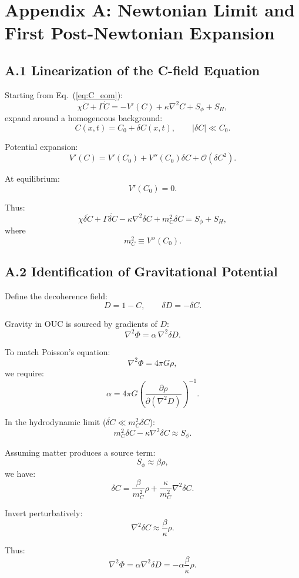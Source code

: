 \appendix
\section*{Appendix A: Newtonian Limit and First Post-Newtonian Expansion}


\subsection*{A.1 Linearization of the C-field Equation}

Starting from Eq.~(\ref{eq:C_eom}):
\[
\chi\ddot C + \Gamma\dot C
= -V'(C) + \kappa\nabla^2 C + S_\phi + S_H,
\]
expand around a homogeneous background:
\[
C(x,t) = C_0 + \delta C(x,t),
\qquad | \delta C | \ll C_0.
\]

Potential expansion:
\[
V'(C) = V'(C_0) + V''(C_0)\delta C + \mathcal{O}(\delta C^2).
\]

At equilibrium:
\[
V'(C_0)=0.
\]

Thus:
\[
\chi \ddot{\delta C} + \Gamma \dot{\delta C} 
- \kappa \nabla^2 \delta C + m_C^2 \delta C
= S_\phi + S_H,
\]
where
\[
m_C^2 \equiv V''(C_0).
\]

\subsection*{A.2 Identification of Gravitational Potential}

Define the decoherence field:
\[
D = 1 - C,
\qquad \delta D = -\delta C.
\]

Gravity in OUC is sourced by gradients of $D$:
\[
\nabla^2 \Phi = \alpha \, \nabla^2 \delta D.
\]

To match Poisson's equation:
\[
\nabla^2 \Phi = 4\pi G \rho,
\]
we require:
\[
\alpha = 4\pi G \left( \frac{\partial \rho}{\partial (\nabla^2 D)} \right)^{-1}.
\]

In the hydrodynamic limit ($\ddot{\delta C} \ll m_C^2 \delta C$):
\[
m_C^2 \delta C - \kappa \nabla^2 \delta C \approx S_\phi.
\]

Assuming matter produces a source term:
\[
S_\phi \approx \beta \rho,
\]
we have:
\[
\delta C = \frac{\beta}{m_C^2} \rho
+ \frac{\kappa}{m_C^2} \nabla^2 \delta C.
\]

Invert perturbatively:
\[
\nabla^2 \delta C \approx \frac{\beta}{\kappa} \rho.
\]

Thus:
\[
\nabla^2 \Phi
= \alpha \nabla^2 \delta D
= -\alpha \frac{\beta}{\kappa} \rho.
\]

